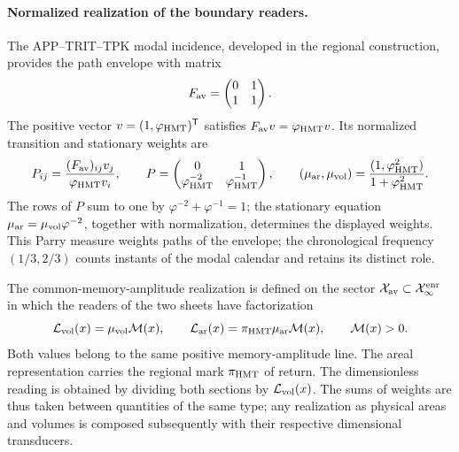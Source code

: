 \paragraph{Normalized realization of the boundary readers.}
The APP--TRIT--TPK modal incidence, developed in the regional
construction, provides the path envelope with matrix
\[
 F_{\rm av}=\begin{pmatrix}0&1\\1&1\end{pmatrix}.
\]
The positive vector \(v=(1,\varphi_{\rm HMT})^{\mathsf T}\)
satisfies \(F_{\rm av}v=\varphi_{\rm HMT}v\). Its normalized
transition and stationary weights are
\begin{equation}
 P_{ij}=\frac{(F_{\rm av})_{ij}v_j}{\varphi_{\rm HMT}v_i},
 \qquad
 P=\begin{pmatrix}0&1\\
 \varphi_{\rm HMT}^{-2}&\varphi_{\rm HMT}^{-1}\end{pmatrix},
 \qquad
 (\mu_{\rm ar},\mu_{\rm vol})
 =\frac{(1,\varphi_{\rm HMT}^{2})}{1+\varphi_{\rm HMT}^{2}}.
 \label{vii:eq:lectores-parry}
\end{equation}
The rows of \(P\) sum to one by
\(\varphi^{-2}+\varphi^{-1}=1\); the stationary equation
\(\mu_{\rm ar}=\mu_{\rm vol}\varphi^{-2}\), together with
normalization, determines the displayed weights. This Parry measure
weights paths of the envelope; the chronological frequency
\((1/3,2/3)\) counts instants of the modal calendar and retains
its distinct role.

The common-memory-amplitude realization is defined on the sector
\(\mathcal X_{\rm av}\subset\mathcal X_\infty^{\rm enr}\) in which
the readers of the two sheets have factorization
\begin{equation}
 \mathcal L_{\rm vol}(x)=\mu_{\rm vol}\mathcal M(x),\qquad
 \mathcal L_{\rm ar}(x)=\pi_{\rm HMT}\mu_{\rm ar}\mathcal M(x),
 \qquad \mathcal M(x)>0.
 \label{vii:eq:lectores-amplitud-comun}
\end{equation}
Both values belong to the same positive memory-amplitude
line. The areal representation carries the regional mark
\(\pi_{\rm HMT}\) of return. The dimensionless reading is obtained
by dividing both sections by \(\mathcal L_{\rm vol}(x)\).
The sums of weights are thus taken between quantities of the
same type; any realization as physical areas and volumes
is composed subsequently with their respective dimensional transducers.

